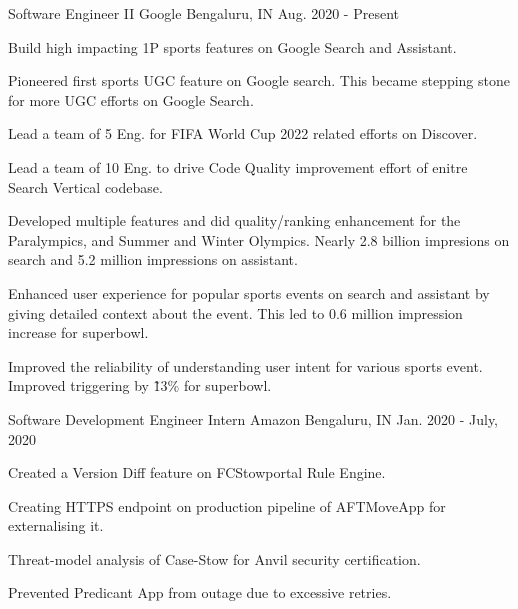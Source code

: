 


\begin{cventries}


\cventry
{Software Engineer II} %
{Google} %
{Bengaluru, IN} %
{Aug. 2020 - Present} %
{ %
\begin{cvitems}
\item {Build high impacting 1P sports features on Google Search and Assistant.}
\item {Pioneered first sports UGC feature on Google search. This became stepping stone for more UGC efforts on Google Search.}
\item {Lead a team of 5 Eng. for FIFA World Cup 2022 related efforts on Discover.}
\item {Lead a team of 10 Eng. to drive Code Quality improvement effort of enitre Search Vertical codebase.}
\item {Developed multiple features and did quality/ranking enhancement for the Paralympics, and Summer and Winter Olympics. Nearly 2.8 billion impresions on search and 5.2 million impressions on assistant.}
\item {Enhanced user experience for popular sports events on search and assistant by giving detailed context about the event. This led to 0.6 million impression increase for superbowl.}
\item {Improved the reliability of understanding user intent for various sports event. Improved triggering by \~13\% for superbowl.}
\end{cvitems}
}


\cventry
{Software Development Engineer Intern} %
{Amazon} %
{Bengaluru, IN} %
{Jan. 2020 - July, 2020} %
{ %
\begin{cvitems}
\item {Created a Version Diff feature on FCStowportal Rule Engine.}
\item {Creating HTTPS endpoint on production pipeline of AFTMoveApp for externalising it.}
\item {Threat-model analysis of Case-Stow for Anvil security certification.}
\item {Prevented Predicant App from outage due to excessive retries.}
\end{cvitems}
}


\end{cventries}